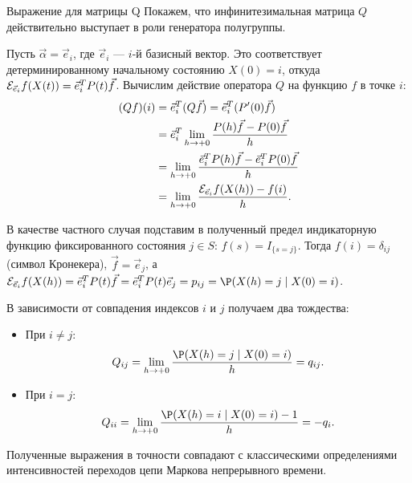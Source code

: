 \begin{example}{Выражение для матрицы Q}
    Покажем, что инфинитезимальная матрица $Q$ действительно выступает в роли генератора полугруппы. 
\end{example}
\begin{eproof}
Пусть $\vec{\alpha} = \vec{e}_i$, где $\vec{e}_i$ — $i$-й базисный вектор. Это соответствует детерминированному начальному состоянию $X(0) = i$, откуда $\mathcal{E}_{\vec{e}_i} f(X(t)) = \vec{e}_i^T P(t) \vec{f}$. Вычислим действие оператора $Q$ на функцию $f$ в точке $i$:
    \begin{align*}
        (Qf)(i) &= \vec{e}_i^T (Q\vec{f}) = \vec{e}_i^T (P'(0) \vec{f}) \\
        &= \vec{e}_i^T \lim_{h \to +0} \frac{P(h)\vec{f} - P(0)\vec{f}}{h} \\
    &= \lim_{h \to +0} \frac{\vec{e}_i^T P(h)\vec{f} - \vec{e}_i^T P(0)\vec{f}}{h} \\
        &= \lim_{h \to +0} \frac{\mathcal{E}_{\vec{e}_i} f(X(h)) - f(i)}{h}.
    \end{align*}

    В качестве частного случая подставим в полученный предел индикаторную функцию фиксированного состояния $j \in S$: $f(s) = I_{\{s = j\}}$. Тогда $f(i) = \delta_{ij}$ (символ Кронекера), $\vec{f} = \vec{e}_j$, а $\E_{\vec{e}_i} f(X(h)) = \vec{e}_i^T P(t) \vec{f} = \vec{e}_i^T P(t) \vec{e}_j = p_{ij} = \P(X(h)=j \mid X(0)=i)$. 
    
    В зависимости от совпадения индексов $i$ и $j$ получаем два тождества:
    \begin{itemize}
        \item При $i \neq j$:
        \[
            Q_{ij} = \lim_{h \to +0} \frac{\P(X(h)=j \mid X(0)=i)}{h} = q_{ij}.
        \]
        \item При $i = j$:
        \[
            Q_{ii} = \lim_{h \to +0} \frac{\P(X(h)=i \mid X(0)=i) - 1}{h} = -q_i.
        \]
    \end{itemize}
    Полученные выражения в точности совпадают с классическими определениями интенсивностей переходов цепи Маркова непрерывного времени.
\end{eproof}

